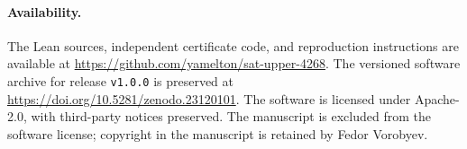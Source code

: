 \paragraph{Availability.}
The Lean sources, independent certificate code, and reproduction instructions
are available at
\url{https://github.com/yamelton/sat-upper-4268}.
The versioned software archive for release \texttt{v1.0.0} is preserved at
\url{https://doi.org/10.5281/zenodo.23120101}.
The software is licensed under Apache-2.0, with
third-party notices preserved. The manuscript is excluded from the software
license; copyright in the manuscript is retained by Fedor Vorobyev.
